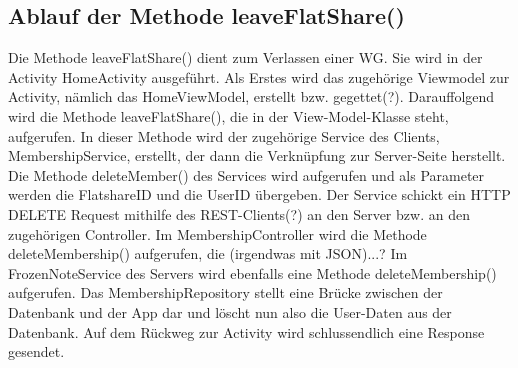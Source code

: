 \subsection{Ablauf der Methode leaveFlatShare()}

Die Methode leaveFlatShare() dient zum Verlassen einer WG. Sie wird in der Activity HomeActivity ausgeführt. Als Erstes wird das zugehörige Viewmodel zur Activity, nämlich das HomeViewModel, erstellt bzw. gegettet(?). Darauffolgend wird die Methode leaveFlatShare(), die in der View-Model-Klasse steht, aufgerufen. In dieser Methode wird der zugehörige Service des Clients, MembershipService, erstellt, der dann die Verknüpfung zur Server-Seite herstellt. Die Methode deleteMember() des Services wird aufgerufen und als Parameter werden die FlatshareID und die UserID übergeben. Der Service schickt ein HTTP DELETE Request mithilfe des REST-Clients(?) an den Server bzw. an den zugehörigen Controller. Im MembershipController wird die Methode deleteMembership() aufgerufen, die (irgendwas mit JSON)...? Im FrozenNoteService des Servers wird ebenfalls eine Methode deleteMembership() aufgerufen. Das MembershipRepository stellt eine Brücke zwischen der Datenbank und der App dar und löscht nun also die User-Daten aus der Datenbank. Auf dem Rückweg zur Activity wird schlussendlich eine Response gesendet.